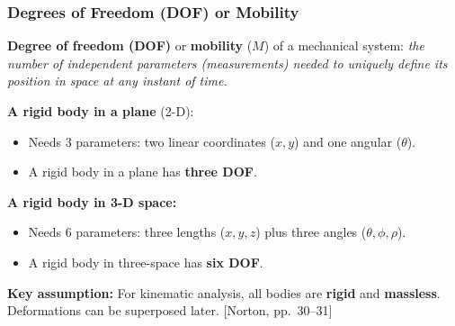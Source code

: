 \documentclass[10pt,aspectratio=43]{beamer}
\newcommand{\pref}[1]{\vfill\hfill{\scriptsize\color{gray}[Norton, pp.~#1]}}
\begin{document}
\begin{frame}
\frametitle{Degrees of Freedom (DOF) or Mobility}

\begin{yellowbox}
\textbf{Degree of freedom (DOF)} or \textbf{mobility} ($M$) of a mechanical system: \emph{the number of independent parameters (measurements) needed to uniquely define its position in space at any instant of time.}
\end{yellowbox}

\vspace{6pt}
\textbf{A rigid body in a plane} (2-D):
\begin{itemize}
  \item Needs 3 parameters: two linear coordinates ($x, y$) and one angular ($\theta$).
  \item A rigid body in a plane has \textbf{three DOF}.
\end{itemize}

\vspace{4pt}
\textbf{A rigid body in 3-D space:}
\begin{itemize}
  \item Needs 6 parameters: three lengths ($x, y, z$) plus three angles ($\theta, \phi, \rho$).
  \item A rigid body in three-space has \textbf{six DOF}.
\end{itemize}

\vspace{4pt}
\textbf{Key assumption:} For kinematic analysis, all bodies are \textbf{rigid} and \textbf{massless}. Deformations can be superposed later.
\pref{30--31}
\end{frame}

\end{document}
